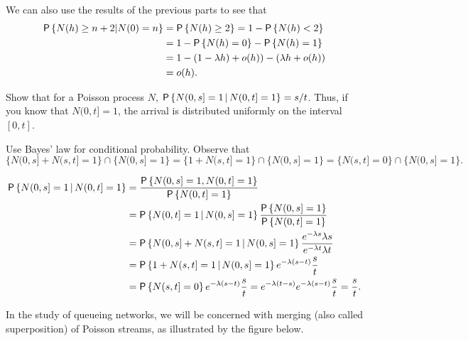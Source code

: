 \begin{exercise}
\begin{solution}
\begin{enumerate}
We can also use the results of the previous parts to see that
\begin{equation*}
    \begin{split}
  \P{N(h) \geq n+2 | N(0) = n} 
&= \P{N(h) \geq 2} = 1- \P{N(h)<2} \\
&= 1 - \P{N(h)= 0} - \P{N(h)=1} \\
&= 1 - (1-\lambda h) + o(h) ) - (\lambda h + o(h)) \\
&= o(h).
\end{split}  
\end{equation*}
\end{enumerate}
\end{solution}
\end{exercise}


\begin{exercise}
Show that  for a Poisson process $N$, 
$ \P{N(0,s] =1\given N(0,t]=1} = s/t$. Thus, if you know that $N(0,t]=1$, the arrival is distributed
uniformly on the interval $[0,t]$.
\begin{hint}
Use Bayes' law for conditional probability. Observe that 
  \begin{equation*}
\{N(0,s]+N(s,t]=1\}\cap\{N(0,s]=1\} = \{1+N(s,t]=1\}\cap\{N(0,s]=1\}=\{N(s,t]=0\}\cap\{N(0,s]=1\}.
  \end{equation*}
\end{hint}
\begin{solution}
\begin{equation*}
  \begin{split}
  \P{N(0,s] =1\given N(0,t]=1} 
&= \frac{\P{N(0,s] =1, N(0,t]=1}}{\P{N(0,t]=1}} \\
&=   \P{N(0,t] =1\given N(0,s]=1} \frac{\P{N(0,s] =1}}{\P{N(0,t]=1}} \\
&=   \P{N(0,s] + N(s,t] =1\given N(0,s]=1} \frac{e^{-\lambda s}\lambda s}{e^{-\lambda t} \lambda t} \\
&=   \P{1 + N(s,t] =1\given N(0,s]=1} e^{-\lambda (s-t)} \frac{s}{t} \\
&=   \P{N(s,t] =0} e^{-\lambda (s-t)} \frac{s}{t} = e^{-\lambda(t-s)} e^{-\lambda (s-t)} \frac{s}{t} = \frac st.
  \end{split}
\end{equation*}
\end{solution}
\end{exercise}

In the study of queueing networks, we will be concerned with  merging (also called
  superposition) of Poisson streams, as illustrated by the figure below.

